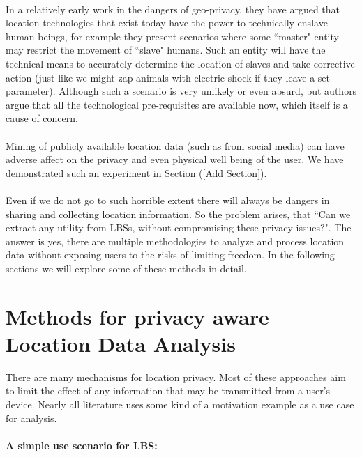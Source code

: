 \documentclass{report}
\begin{document}
\paragraph{}
In a relatively early work \cite{dobson2003geoslavery} in the dangers of geo-privacy, they have argued that location technologies that exist today have the power to technically enslave human beings, for example they present scenarios where some ``master" entity may restrict the movement of ``slave" humans. Such an entity will have the technical means to accurately determine the location of slaves and take corrective action (just like we might zap animals with electric shock if they leave a set parameter). Although such a scenario is very unlikely or even absurd, but authors argue that all the technological pre-requisites are available now, which itself is a cause of concern.

\paragraph{}
Mining of publicly available location data (such as from social media) can have adverse affect on the privacy and even physical well being of the user. We have demonstrated such an experiment in Section ([Add Section]). 



\paragraph{}
Even if we do not go to such horrible extent there will always be dangers in sharing and collecting location information. So the problem arises, that ``Can we extract any utility from LBSs, without compromising these privacy issues?". The answer is yes, there are multiple methodologies to analyze and process location data without exposing users to the risks of limiting freedom.  In the following sections we will explore some of these methods in detail.

\section{Methods for privacy aware Location Data Analysis}
There are many mechanisms for location privacy. Most of these approaches aim to limit the effect of any information that may be transmitted from a user's device. Nearly all literature uses some kind of a motivation example as a use case for analysis.
\paragraph{A simple use scenario for LBS:}
\end{document}

